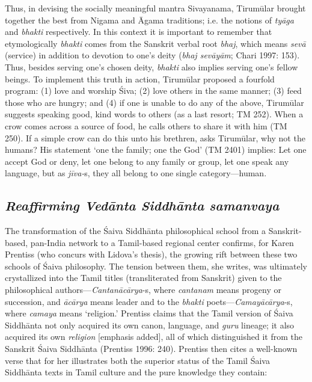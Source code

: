 Thus, in devising the socially meaningful mantra Sivayanama, Tirumūlar brought together the best from Nigama and Āgama traditions; i.e. the notions of \textit{tyāga} and \textit{bhakti} respectively. In this context it is important to remember that etymologically \textit{bhakti} comes from the Sanskrit verbal root \textit{bhaj}, which means \textit{sevā} (service) in addition to devotion to one’s deity (\textit{bhaj sevāyām}; Chari 1997: 153). Thus, besides serving one’s chosen deity, \textit{bhakti} also implies serving one’s fellow beings. To implement this truth in action, Tirumūlar proposed a fourfold program: (1) love and worship Śiva; (2) love others in the same manner; (3) feed those who are hungry; and (4) if one is unable to do any of the above, Tirumūlar suggests speaking good, kind words to others (as a last resort; TM 252). When a crow comes across a source of food, he calls others to share it with him (TM 250). If a simple crow can do this unto his brethren, asks Tirumūlar, why not the humans? His statement ‘one the family; one the God’ (TM 2401) implies: Let one accept God or deny, let one belong to any family or group, let one speak any language, but as \textit{jīva-}s, they all belong to one single category—human.


\subsection*{\textit{Reaffirming Vedānta Siddhānta samanvaya}}

\vskip -8pt

The transformation of the Śaiva Siddhānta philosophical school from a Sanskrit-based, pan-India network to a Tamil-based regional center confirms, for Karen Prentiss (who concurs with Lidova’s thesis), the growing rift between these two schools of Śaiva philosophy. The tension between them, she writes, was ultimately crystallized into the Tamil titles (transliterated from Sanskrit) given to the philosophical authors—\textit{Cantanācārya}-s, where \textit{cantanam} means progeny or succession, and \textit{ācārya} means leader and to the \textit{bhakti} poets—\textit{Camayācārya}-s, where \textit{camaya} means ‘religion.’ Prentiss claims that the Tamil version of Śaiva Siddhānta not only acquired its own canon, language, and \textit{guru} lineage; it also acquired its own \textit{religion} [emphasis added], all of which distinguished it from the Sanskrit Śaiva Siddhānta (Prentiss 1996: 240). Prentiss then cites a well-known verse that for her illustrates both the superior status of the Tamil Śaiva Siddhānta texts in Tamil culture and the pure knowledge they contain:

